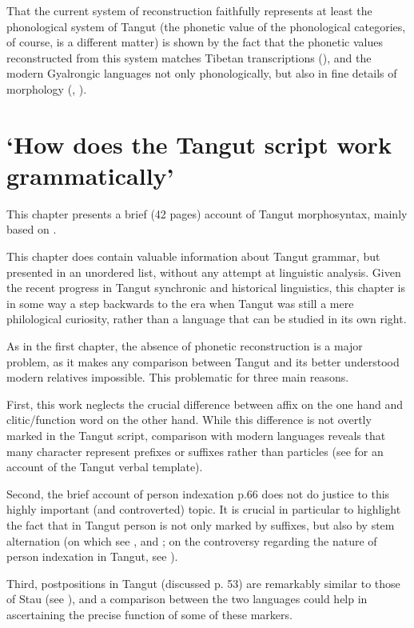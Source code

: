 \documentclass[oneside,a4paper,11pt]{article}
\begin{document}
That the current system of reconstruction faithfully represents at least the phonological system of Tangut (the phonetic value of the phonological categories, of course, is a different matter) is shown by the fact that the phonetic values reconstructed from this system matches Tibetan transcriptions (\citealt{nie86qianjiazi, tai08duiyin}), and the modern Gyalrongic languages not only phonologically, but also in fine details of morphology (\citealt{jacques14esquisse}, \citealt{gong16stems}).


\section{`How does the Tangut script work grammatically'}
This chapter presents a brief (42 pages) account of Tangut morphosyntax, mainly based on \citet{kepping85}. 

This chapter does contain valuable information about Tangut grammar, but presented in an unordered list, without any attempt at linguistic analysis. Given the recent progress in Tangut synchronic and historical linguistics, this chapter is in some way a step backwards to the era when Tangut was still a mere philological curiosity, rather than a language that can be studied in its own right.

As in the first chapter, the absence of phonetic reconstruction is a major problem, as it makes any comparison between Tangut and its better understood modern relatives impossible. This problematic for three main reasons.

First, this work neglects the crucial difference between affix on the one hand and clitic/function word on the other hand. While this difference is not overtly marked in the Tangut script, comparison with modern languages reveals that many character represent prefixes or suffixes rather than particles (see \citealt{jacques11tangut.verb} for an account of the Tangut verbal template).

Second, the brief account of person indexation p.66 does not do justice to this highly important (and controverted) topic. It is crucial in particular to highlight the fact that in Tangut person is not only marked by suffixes, but also by stem alternation (on which see \citealt{gong01huying}, \citealt{jacques09tangutverb} and \citealt{gong16stems}; on the controversy regarding the nature of person indexation in Tangut, see \citealt{jacques16th}).
 
 Third, postpositions in Tangut (discussed p. 53) are remarkably similar to those of Stau (see \citealt{jacques17stau}), and a comparison between the two languages could help in ascertaining the precise function of some of these markers.
\end{document}
